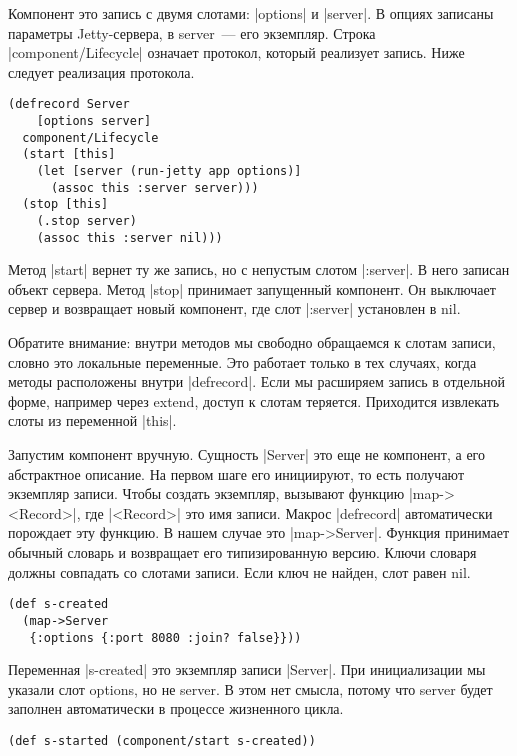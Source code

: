 Компонент это запись с двумя слотами: \spverb|options| и \spverb|server|. В опциях записаны
параметры Jetty-сервера, в server~--- его экземпляр. Строка \spverb|component/Lifecycle|
означает протокол, который реализует запись. Ниже следует реализация протокола.

\begin{verbatim}
(defrecord Server
    [options server]
  component/Lifecycle
  (start [this]
    (let [server (run-jetty app options)]
      (assoc this :server server)))
  (stop [this]
    (.stop server)
    (assoc this :server nil)))
\end{verbatim}

Метод \spverb|start| вернет ту же запись, но с непустым слотом \spverb|:server|. В него
записан объект сервера. Метод \spverb|stop| принимает запущенный компонент. Он
выключает сервер и возвращает новый компонент, где слот \spverb|:server| установлен в
nil.

Обратите внимание: внутри методов мы свободно обращаемся к слотам записи, словно
это локальные переменные. Это работает только в тех случаях, когда методы
расположены внутри \spverb|defrecord|. Если мы расширяем запись в отдельной форме,
например через extend, доступ к слотам теряется. Приходится извлекать слоты из
переменной \spverb|this|.

Запустим компонент вручную. Сущность \spverb|Server| это еще не компонент, а его
абстрактное описание. На первом шаге его инициируют, то есть получают экземпляр
записи. Чтобы создать экземпляр, вызывают функцию \spverb|map-><Record>|, где
\spverb|<Record>| это имя записи. Макрос \spverb|defrecord| автоматически порождает эту
функцию. В нашем случае это \spverb|map->Server|. Функция принимает обычный словарь и
возвращает его типизированную версию. Ключи словаря должны совпадать со слотами
записи. Если ключ не найден, слот равен nil.

\begin{verbatim}
(def s-created
  (map->Server
   {:options {:port 8080 :join? false}}))
\end{verbatim}

Переменная \spverb|s-created| это экземпляр записи \spverb|Server|. При инициализации мы
указали слот options, но не server. В этом нет смысла, потому что server будет
заполнен автоматически в процессе жизненного цикла.

\begin{verbatim}
(def s-started (component/start s-created))
\end{verbatim}

